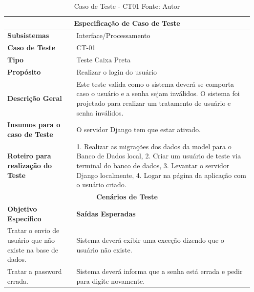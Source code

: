 \begin{table}[H]
    \begin{center}
        \begin{tabular}{|p{5cm}|p{12cm}|}
            \hline
            \multicolumn{2}{|c|}{\textbf{Especificação de Caso de Teste}} \\ \hline
                \textbf{Subsistemas}                               & Interface/Processamento \\ \hline
                \textbf{Caso de Teste}                             & CT-01 \\ \hline
                \textbf{Tipo}                                             & Teste Caixa Preta \\ \hline
                \textbf{Propósito}                                     & Realizar o login do usuário \\ \hline
                \textbf{Descrição Geral}                           & Este teste valida como o sistema deverá se comporta caso o usuário e a senha sejam inválidos. O sistema foi projetado para realizar um tratamento de usuário e senha inválidos. \\ \hline
                \textbf{Insumos para o caso de Teste}    & O servidor Django tem que estar ativado. \\ \hline
                \textbf{Roteiro para realização do Teste}&  1. Realizar as migrações dos dados da model para o Banco de Dados local, 2. Criar um usuário de teste via terminal do banco de dados, 3. Levantar o servidor Django localmente, 4. Logar na página da aplicação com o usuário criado. \\ \hline
            \multicolumn{2}{|c|}{\textbf{Cenários de Teste}} \\ \hline
                \textbf{Objetivo Específico}                      & \textbf{Saídas Esperadas} \\ \hline
                Tratar o envio de usuário que não existe na base de dados. & Sistema deverá exibir uma exceção dizendo que o usuário não existe. \\ \hline
                Tratar a password errada. & Sistema deverá informa que a senha está errada e pedir para digite novamente. \\ \hline
        \end{tabular}
    \end{center}
    \caption[Caso de Teste - CT01]{Caso de Teste - CT01
    \protect Fonte: Autor}
    \label{CT-01}
\end{table}

